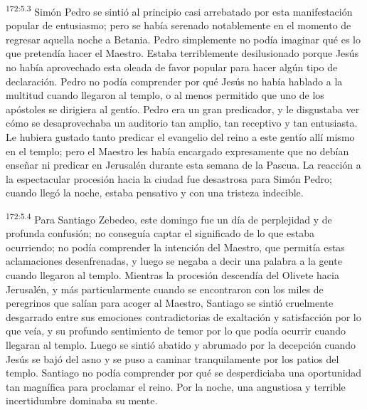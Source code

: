 \par
\textsuperscript{172:5.3} Simón Pedro se sintió al principio casi arrebatado por esta manifestación popular de entusiasmo; pero se había serenado notablemente en el momento de regresar aquella noche a Betania. Pedro simplemente no podía imaginar qué es lo que pretendía hacer el Maestro. Estaba terriblemente desilusionado porque Jesús no había aprovechado esta oleada de favor popular para hacer algún tipo de declaración. Pedro no podía comprender por qué Jesús no había hablado a la multitud cuando llegaron al templo, o al menos permitido que uno de los apóstoles se dirigiera al gentío. Pedro era un gran predicador, y le disgustaba ver cómo se desaprovechaba un auditorio tan amplio, tan receptivo y tan entusiasta. Le hubiera gustado tanto predicar el evangelio del reino a este gentío allí mismo en el templo; pero el Maestro les había encargado expresamente que no debían enseñar ni predicar en Jerusalén durante esta semana de la Pascua. La reacción a la espectacular procesión hacia la ciudad fue desastrosa para Simón Pedro; cuando llegó la noche, estaba pensativo y con una tristeza indecible.

\par
\textsuperscript{172:5.4} Para Santiago Zebedeo, este domingo fue un día de perplejidad y de profunda confusión; no conseguía captar el significado de lo que estaba ocurriendo; no podía comprender la intención del Maestro, que permitía estas aclamaciones desenfrenadas, y luego se negaba a decir una palabra a la gente cuando llegaron al templo. Mientras la procesión descendía del Olivete hacia Jerusalén, y más particularmente cuando se encontraron con los miles de peregrinos que salían para acoger al Maestro, Santiago se sintió cruelmente desgarrado entre sus emociones contradictorias de exaltación y satisfacción por lo que veía, y su profundo sentimiento de temor por lo que podía ocurrir cuando llegaran al templo. Luego se sintió abatido y abrumado por la decepción cuando Jesús se bajó del asno y se puso a caminar tranquilamente por los patios del templo. Santiago no podía comprender por qué se desperdiciaba una oportunidad tan magnífica para proclamar el reino. Por la noche, una angustiosa y terrible incertidumbre dominaba su mente.

